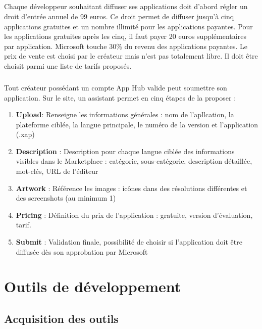 \documentclass[twoside,UTF8]{EPURapport}
\begin{document}
\paragraph{}
Chaque développeur souhaitant diffuser ses applications doit d'abord régler un droit d'entrée annuel de 99 euros. Ce droit permet de diffuser jusqu'à cinq applications gratuites et un nombre illimité pour les applications payantes. Pour les applications gratuites après les cinq, il faut payer 20 euros supplémentaires par application. Microsoft touche 30\% du revenu des applications payantes. Le prix de vente est choisi par le créateur mais n'est pas totalement libre. Il doit être choisit parmi une liste de tarifs proposés. 

\paragraph{}
Tout créateur possédant un compte App Hub valide peut soumettre son application. Sur le site, un assistant permet en cinq étapes de la proposer : 
\begin{enumerate}
	\item \textbf{Upload}: Renseigne les informations générales : nom de l'apllcation, la plateforme ciblée, la langue principale, le numéro de la version et l'application (.xap)
	\item \textbf{Description} : Description pour chaque langue ciblée des informations visibles dans le Marketplace : catégorie, sous-catégorie, description détaillée, mot-clés, URL de l'éditeur
	\item \textbf{Artwork} : Référence les images : icônes dans des résolutions différentes et des screenshots (au minimum 1)
	\item \textbf{Pricing} : Définition du prix de l'application : gratuite, version d'évaluation, tarif.
	\item \textbf{Submit} : Validation finale, possibilité de choisir si l'application doit être diffusée dès son approbation par Microsoft
\end{enumerate}


	
\chapter{Outils de développement}
	\section{Acquisition des outils}
\end{document}
